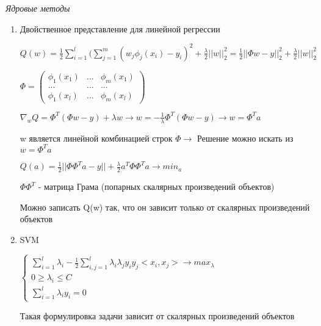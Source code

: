 \documentclass[a4paper, 12pt]{article}
\begin{document}
\begin{center}
    \textit{Ядровые методы}
\end{center}
\begin{enumerate}
    \item Двойственное представление для линейной регрессии
    \newline
    
    $Q(w) = \frac{1}{2}\sum_{i = 1}^{l}(\sum_{j = 1}^{m}(w_{j}\phi_{j}(x_{i}) - y_{i})^{2} + \frac{\lambda}{2}||w||^{2}_{2} = \frac{1}{2}||\Phi w - y||_{2}^{2} + \frac{\lambda}{2}||w||_{2}^{2}$
    \newline
    
    $\Phi = \begin{pmatrix}\phi_{1}(x_{1}) & ... & \phi_{m}(x_{1}) \\ ... & ... & ... \\ \phi_{1}(x_{l}) & ... & \phi_{m}(x_{l}) \end{pmatrix}$
    
    $\nabla_{w}Q = \Phi^{T}(\Phi w - y) + \lambda w \rightarrow w = -\frac{1}{\lambda}\Phi^{T}(\Phi w - y) \rightarrow w = \Phi^{T}a$
    \newline
    
    w является линейной комбинацией строк $\Phi \rightarrow$ Решение можно искать из $w = \Phi^{T}a$ 
    
    $Q(a) = \frac{1}{2}||\Phi \Phi^{T}a - y|| + \frac{\lambda}{2}a^{T} \Phi \Phi^{T}a \rightarrow min_{a}$
    \newline
    
    $\Phi \Phi^{T}$ - матрица Грама (попарных скалярных произведений объектов)
    \newline
    
    Можно записать Q(w) так, что он зависит только от скалярных произведений объектов
    
    \item SVM
    
    $\begin{cases}
    \sum_{i = 1}^{l} \lambda_{i} - \frac{1}{2} \sum_{i, j = 1}^{l} \lambda_{i}\lambda_{j}y_{i}y_{j}<x_{i}, x_{j}> \rightarrow max_{\lambda} \\
    0 \geq \lambda_{i} \leq C
    \\
    \sum_{i = 1}^{l} \lambda_{i}y_{i} = 0
    \end{cases}$
    
    Такая формулировка задачи зависит от скалярных произведений объектов
    

\end{enumerate}
\end{document}
